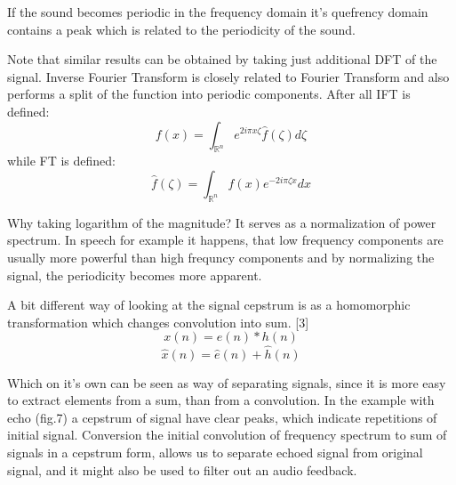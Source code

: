 \documentclass[12pt,a4paper,english]{article}
\begin{document}
\begin{minipage}[5cm,0]{11cm}

If the sound becomes periodic in the frequency domain it's quefrency domain contains a peak which is related to the periodicity of the sound. \newline

Note that similar results can be obtained by taking just additional DFT of the signal. Inverse Fourier Transform is closely related to Fourier Transform and also performs a split of the function into periodic components. \newline
\newline
After all IFT is defined:
\begin{equation}
     f(x) = \int_{\mathbb{R} ^ n} e^{2 i \pi x \zeta} \hat{f}(\zeta) d\zeta
\end{equation}
while FT is defined: 
\begin{equation}
    \hat{f}(\zeta) = \int_{\mathbb{R} ^ n} f(x) e^{-2 i \pi \zeta x} dx
\end{equation}

Why taking logarithm of the magnitude? It serves as a normalization of power spectrum. In speech for example it happens, that low frequency components are usually more powerful than high frequncy components and by normalizing the signal, the periodicity becomes more apparent. \newline


A bit different way of looking at the signal cepstrum is as a homomorphic transformation which changes convolution into sum. [3]
\begin{equation}
x(n) = e(n) * h(n)
\end{equation}
\begin{equation}
\hat x(n) = \hat e(n) + \hat h(n)
\end{equation}


Which on it's own can be seen as way of separating signals, since it is more easy to extract elements from a sum, than from a convolution.
\newline
\newline
In the example with echo (fig.7) a cepstrum of signal have clear peaks, which indicate repetitions of initial signal. Conversion the initial convolution of frequency spectrum to sum of signals in a cepstrum form, allows us to separate echoed signal from original signal, and it might also be used to filter out an audio feedback.

\end{minipage}
\newline
\newline
{}
\label{fig:fig1}
\end{document}
